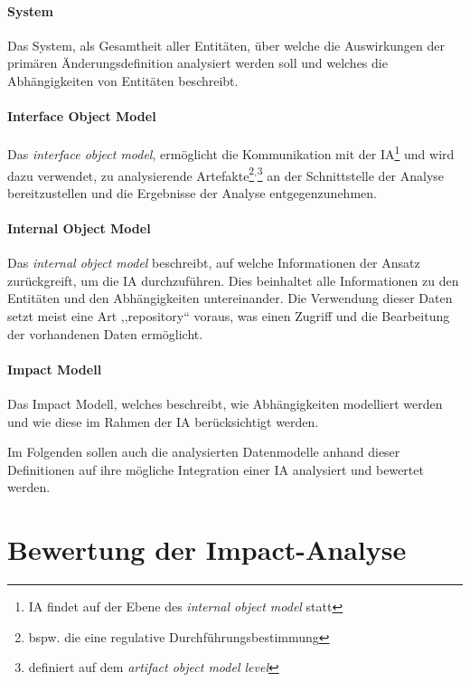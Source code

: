     \paragraph{System}
        Das System, als Gesamtheit aller Entitäten, über welche die Auswirkungen der primären Änderungsdefinition analysiert werden soll und welches die Abhängigkeiten von Entitäten beschreibt.
    
    \paragraph{Interface Object Model}
        Das \textit{interface object model}, ermöglicht die Kommunikation mit der \ac{IA}\footnote{\ac{IA} findet auf der Ebene des \textit{internal object model} statt} und wird dazu verwendet, zu analysierende Artefakte\footnote{bspw. die eine regulative Durchführungsbestimmung}$^,$\footnote{definiert auf dem \textit{artifact object model level}} an der Schnittstelle der Analyse bereitzustellen und die Ergebnisse der Analyse entgegenzunehmen.  
    
    \paragraph{Internal Object Model}
        Das \textit{internal object model} beschreibt, auf welche Informationen der Ansatz zurückgreift, um die \ac{IA} durchzuführen.
        Dies beinhaltet alle Informationen zu den Entitäten und den Abhängigkeiten untereinander.
        Die Verwendung dieser Daten setzt meist eine Art ,,repository`` voraus, was einen Zugriff und die Bearbeitung der vorhandenen Daten ermöglicht. \cite[295]{app_bohner}
    
    \paragraph{Impact Modell}
        Das Impact Modell, welches beschreibt, wie Abhängigkeiten modelliert werden und wie diese im Rahmen der \ac{IA} berücksichtigt werden.
    
    \bigskip
    \noindent
    Im Folgenden sollen auch die analysierten Datenmodelle anhand dieser Definitionen auf ihre mögliche Integration einer \ac{IA} analysiert und bewertet werden.
    
\pagebreak
\section{Bewertung der Impact-Analyse}
\label{model_ia_bew}
    
